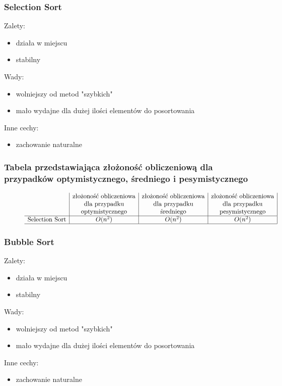 \documentclass[polish,polish,a4paper]{article}
\begin{document}
\begin{spacing}{1.5}
		\subsubsection*{Selection Sort}
	Zalety:
	\begin{itemize}
		\item działa w miejscu
		\item stabilny 
	\end{itemize}
	Wady:
	\begin{itemize}
		\item wolniejszy od metod "szybkich"
		\item mało wydajne dla dużej ilości elementów do posortowania
	\end{itemize}
	Inne cechy:
	\begin{itemize}
		\item zachowanie naturalne
	\end{itemize}
	
				\subsubsection*{Tabela przedstawiająca złożoność obliczeniową dla przypadków optymistycznego, średniego i pesymistycznego} 
	\begin{figure}[H]

		\begin{equation*}
		\begin{array}{l|c|c|c|}

		&$złożoność obliczeniowa$&$złożoność obliczeniowa$&$złożoność obliczeniowa$\\
		&$dla przypadku$&$dla przypadku$&$dla przypadku$\\
		&$optymistycznego$&$średniego$&$pesymistycznego$\\
		\hline
		$Selection Sort$&O(n^2)&O(n^2)&O(n^2)\\
		\hline
		\end{array}
		\end{equation*}
	\end{figure}
	
	
			\subsubsection*{Bubble Sort}
	Zalety:
	\begin{itemize}
		\item działa w miejscu
		\item stabilny 
	\end{itemize}
	Wady:
	\begin{itemize}
		\item wolniejszy od metod "szybkich"
		\item mało wydajne dla dużej ilości elementów do posortowania
	\end{itemize}
	Inne cechy:
	\begin{itemize}
		\item zachowanie naturalne
	\end{itemize}
	

\end{spacing}
\end{document}
